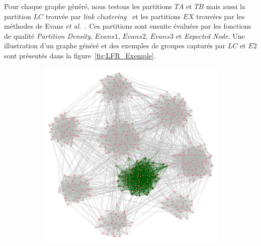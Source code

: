 Pour chaque graphe généré, nous testons les partitions $TA$ et $TB$ mais aussi la partition $LC$ trouvée par \textit{link clustering}~\cite{Ahn2010a} et les partitions $EX$ trouvées par les méthodes de Evans \textit{et al.}~\cite{Evans2009}.
Ces partitions sont ensuite évaluées par les fonctions de qualité \emph{Partition Density}, $Evans1$, $Evans2$, $Evans3$ et \emph{Expected Node}.
Une illustration d'un graphe généré et des exemples de groupes capturés par $LC$ et $E2$ sont présentés dans la figure~\ref{fig:LFR_Exemple}.

\begin{figure}
\centering
	\begin{subfigure}{0.31\textwidth}
		\includegraphics[width=\linewidth]{img/ExpectedNodes/LF/Graphe_Complet_select.png}
		\caption{}
	\end{subfigure}
	\begin{subfigure}{0.31\textwidth}

\end{subfigure}
\end{figure}
